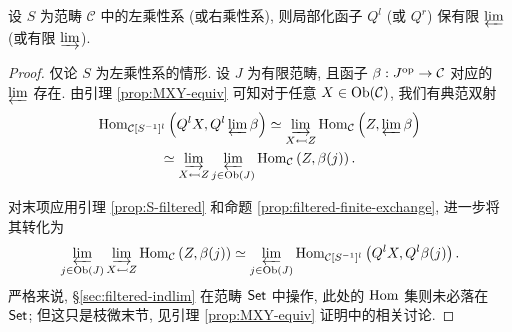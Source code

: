 \begin{lemma}\label{prop:localization-prod}
	设 $S$ 为范畴 $\mathcal{C}$ 中的左乘性系 (或右乘性系), 则局部化函子 $Q^l$ (或 $Q^r$) 保有限 $\varprojlim$ (或有限 $\varinjlim$).
\end{lemma}
\begin{proof}
	仅论 $S$ 为左乘性系的情形. 设 $J$ 为有限范畴, 且函子 $\beta: J^{\operatorname{op}} \to \mathcal{C}$ 对应的 $\varprojlim$ 存在. 由引理 \ref{prop:MXY-equiv} 可知对于任意 $X \in \operatorname{Ob}(\mathcal{C})$, 我们有典范双射
	\begin{multline*}
		\operatorname{Hom}_{\mathcal{C}[S^{-1}]^l} \left( Q^l X, Q^l \varprojlim \beta \right) \simeq \varinjlim_{X \leftarrowtail Z} \operatorname{Hom}_{\mathcal{C}}\left( Z, \varprojlim \beta \right) \\
		\simeq \varinjlim_{X \leftarrowtail Z} \varprojlim_{j \in \operatorname{Ob}(J)} \operatorname{Hom}_{\mathcal{C}}\left( Z, \beta(j) \right).
	\end{multline*}

	对末项应用引理 \ref{prop:S-filtered} 和命题 \ref{prop:filtered-finite-exchange}, 进一步将其转化为
	\[ \varprojlim_{j \in \operatorname{Ob}(J)} \varinjlim_{X \leftarrowtail Z} \operatorname{Hom}_{\mathcal{C}}\left( Z, \beta(j) \right) \simeq \varprojlim_{j \in \operatorname{Ob}(J)} \operatorname{Hom}_{\mathcal{C}[S^{-1}]^l} \left(Q^l X, Q^l \beta(j) \right). \]
	严格来说, \S\ref{sec:filtered-indlim} 在范畴 $\mathsf{Set}$ 中操作, 此处的 $\operatorname{Hom}$ 集则未必落在 $\mathsf{Set}$; 但这只是枝微末节, 见引理 \ref{prop:MXY-equiv} 证明中的相关讨论.
\end{proof}

